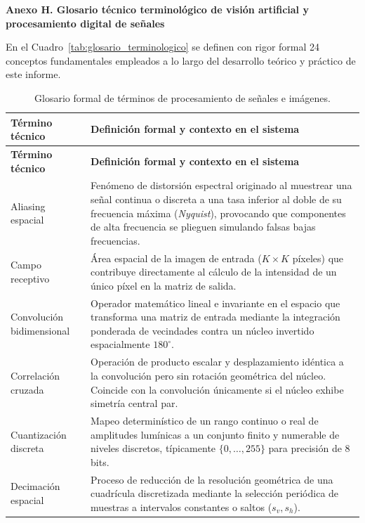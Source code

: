 \documentclass[11pt]{article}
\begin{document}
\textbf{Anexo H. Glosario técnico terminológico de visión artificial y procesamiento digital de señales}

En el Cuadro~\ref{tab:glosario_terminologico} se definen con rigor formal 24 conceptos fundamentales empleados a lo largo del desarrollo teórico y práctico de este informe.

\begin{longtable}{>{\raggedright\arraybackslash}p{3.8cm}>{\raggedright\arraybackslash}p{10.4cm}}
\caption{Glosario formal de términos de procesamiento de señales e imágenes.}\\
\toprule
\textbf{Término técnico} & \textbf{Definición formal y contexto en el sistema} \\
\midrule\endfirsthead
\toprule
\textbf{Término técnico} & \textbf{Definición formal y contexto en el sistema} \\
\midrule\endhead
Aliasing espacial & Fenómeno de distorsión espectral originado al muestrear una señal continua o discreta a una tasa inferior al doble de su frecuencia máxima (\textit{Nyquist}), provocando que componentes de alta frecuencia se plieguen simulando falsas bajas frecuencias. \\
\cellcolor{azulClaro!40}Campo receptivo & \cellcolor{azulClaro!40}Área espacial de la imagen de entrada ($K \times K$ píxeles) que contribuye directamente al cálculo de la intensidad de un único píxel en la matriz de salida. \\
Convolución bidimensional & Operador matemático lineal e invariante en el espacio que transforma una matriz de entrada mediante la integración ponderada de vecindades contra un núcleo invertido espacialmente $180^\circ$. \\
\cellcolor{azulClaro!40}Correlación cruzada & \cellcolor{azulClaro!40}Operación de producto escalar y desplazamiento idéntica a la convolución pero sin rotación geométrica del núcleo. Coincide con la convolución únicamente si el núcleo exhibe simetría central par. \\
Cuantización discreta & Mapeo determinístico de un rango continuo o real de amplitudes lumínicas a un conjunto finito y numerable de niveles discretos, típicamente $\{0, \ldots, 255\}$ para precisión de 8 bits. \\
\cellcolor{azulClaro!40}Decimación espacial & \cellcolor{azulClaro!40}Proceso de reducción de la resolución geométrica de una cuadrícula discretizada mediante la selección periódica de muestras a intervalos constantes o saltos ($s_v, s_h$). \\

\end{longtable}
\end{document}
